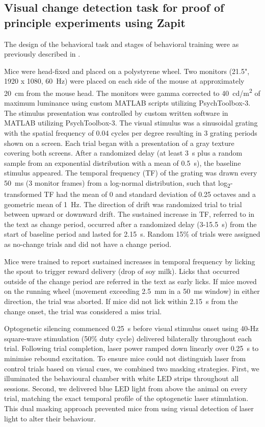 \documentclass[9pt,lineno]{elife}
\begin{document}
\subsection{Visual change detection task for proof of principle experiments using Zapit}
The design of the behavioral task and stages of behavioral training were as previously described in \citealp{Orsolic2021MesoscaleDecision-making.}.

Mice were head-fixed and placed on a polystyrene wheel.
Two monitors (21.5", 1920 x 1080, 60~Hz) were placed on each side of the mouse at approximately 20~cm from the mouse head.
The monitors were gamma corrected to 40~cd/m\textsuperscript{2} of maximum luminance using custom MATLAB scripts utilizing PsychToolbox-3.
The stimulus presentation was controlled by custom written software in MATLAB utilizing PsychToolbox-3.
The visual stimulus was a sinusoidal grating with the spatial frequency of 0.04 cycles per degree resulting in 3 grating periods shown on a screen.
Each trial began with a presentation of a gray texture covering both screens.
After a randomized delay (at least 3~s plus a random sample from an exponential distribution with a mean of 0.5~s), the baseline stimulus appeared.
The temporal frequency (TF) of the grating was drawn every 50~ms (3 monitor frames) from a log-normal distribution, such that log\textsubscript{2}-transformed TF had the mean of 0 and standard deviation of 0.25 octaves and a geometric mean of 1~Hz.
The direction of drift was randomized trial to trial between upward or downward drift.
The sustained increase in TF, referred to in the text as change period, occurred after a randomized delay (3-15.5~s) from the start of baseline period and lasted for 2.15~s.
Random 15\% of trials were assigned as no-change trials and did not have a change period.

Mice were trained to report sustained increases in temporal frequency by licking the spout to trigger reward delivery (drop of soy milk).
Licks that occurred outside of the change period are referred in the text as early licks.
If mice moved on the running wheel (movement exceeding 2.5~mm in a 50~ms window) in either direction, the trial was aborted.
If mice did not lick within 2.15~s from the change onset, the trial was considered a miss trial.

Optogenetic silencing commenced 0.25~s before visual stimulus onset using 40-Hz square-wave stimulation (50\% duty cycle) delivered bilaterally throughout each trial.
Following trial completion, laser power ramped down linearly over 0.25~s to minimise rebound excitation.
To ensure mice could not distinguish laser from control trials based on visual cues, we combined two masking strategies.
First, we illuminated the behavioural chamber with white LED strips throughout all sessions.
Second, we delivered blue LED light from above the animal on every trial, matching the exact temporal profile of the optogenetic laser stimulation.
This dual masking approach prevented mice from using visual detection of laser light to alter their behaviour.
\end{document}
